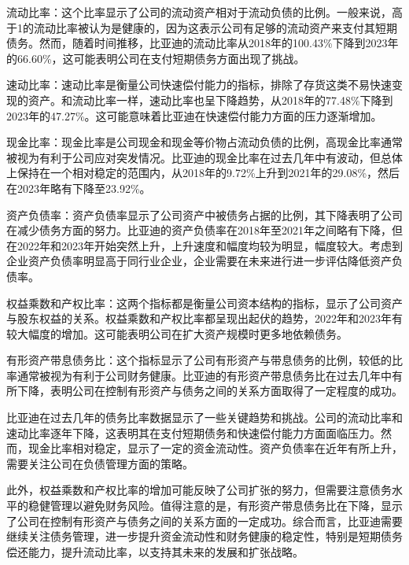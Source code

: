 流动比率：这个比率显示了公司的流动资产相对于流动负债的比例。一般来说，高于1的流动比率被认为是健康的，因为这表示公司有足够的流动资产来支付其短期债务。然而，随着时间推移，比亚迪的流动比率从2018年的100.43\%下降到2023年的66.60\%，这可能表明公司在支付短期债务方面出现了挑战。

速动比率：速动比率是衡量公司快速偿付能力的指标，排除了存货这类不易快速变现的资产。和流动比率一样，速动比率也呈下降趋势，从2018年的77.48\%下降到2023年的47.27\%。这可能意味着比亚迪在快速偿付能力方面的压力逐渐增加。

现金比率：现金比率是公司现金和现金等价物占流动负债的比例，高现金比率通常被视为有利于公司应对突发情况。比亚迪的现金比率在过去几年中有波动，但总体上保持在一个相对稳定的范围内，从2018年的9.72\%上升到2021年的29.08\%，然后在2023年略有下降至23.92\%。

资产负债率：资产负债率显示了公司资产中被债务占据的比例，其下降表明了公司在减少债务方面的努力。比亚迪的资产负债率在2018年至2021年之间略有下降，但在2022年和2023年开始突然上升，上升速度和幅度均较为明显，幅度较大。考虑到企业资产负债率明显高于同行业企业，企业需要在未来进行进一步评估降低资产负债率。

权益乘数和产权比率：这两个指标都是衡量公司资本结构的指标，显示了公司资产与股东权益的关系。权益乘数和产权比率都呈现出起伏的趋势，2022年和2023年有较大幅度的增加。这可能表明公司在扩大资产规模时更多地依赖债务。

有形资产带息债务比：这个指标显示了公司有形资产与带息债务的比例，较低的比率通常被视为有利于公司财务健康。比亚迪的有形资产带息债务比在过去几年中有所下降，表明公司在控制有形资产与债务之间的关系方面取得了一定程度的成功。

比亚迪在过去几年的债务比率数据显示了一些关键趋势和挑战。公司的流动比率和速动比率逐年下降，这表明其在支付短期债务和快速偿付能力方面面临压力。然而，现金比率相对稳定，显示了一定的资金流动性。资产负债率在近年有所上升，需要关注公司在负债管理方面的策略。

此外，权益乘数和产权比率的增加可能反映了公司扩张的努力，但需要注意债务水平的稳健管理以避免财务风险。值得注意的是，有形资产带息债务比在下降，显示了公司在控制有形资产与债务之间的关系方面的一定成功。综合而言，比亚迪需要继续关注债务管理，进一步提升资金流动性和财务健康的稳定性，特别是短期债务偿还能力，提升流动比率，以支持其未来的发展和扩张战略。
